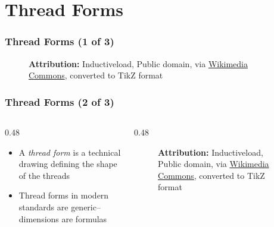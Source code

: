 \section{Thread Forms}

\begin{frame}
	\frametitle{Thread Forms (1 of 3)}

    \begin{figure}
        \centering
        \resizebox{0.625\linewidth}{!}{
            
        }

        \vspace{0.5em}
        {\tiny \textbf{Attribution:} Inductiveload, Public domain, via \href{https://commons.wikimedia.org/wiki/File:ISO_and_UTS_Thread_Dimensions.svg}{Wikimedia Commons}, converted to TikZ format\par}
    \end{figure}
\end{frame}

\begin{frame}
	\frametitle{Thread Forms (2 of 3)}
    \begin{columns}
        \begin{column}{0.48\linewidth}
            \begin{itemize}[<+- | alert@+>]
                \item A \emph{thread form} is a technical drawing defining the shape of the threads
                \item Thread forms in modern standards are generic--dimensions are formulas
            \end{itemize}
        \end{column}
        \begin{column}{0.48\linewidth}
            \begin{figure}
                \centering
                \resizebox{0.875\linewidth}{!}{
                    
                }

                \vspace{0.5em}
                {\tiny \textbf{Attribution:} Inductiveload, Public domain, via \href{https://commons.wikimedia.org/wiki/File:ISO_and_UTS_Thread_Dimensions.svg}{Wikimedia Commons}, converted to TikZ format\par}
            \end{figure}
        \end{column}
    \end{columns}
\end{frame}

